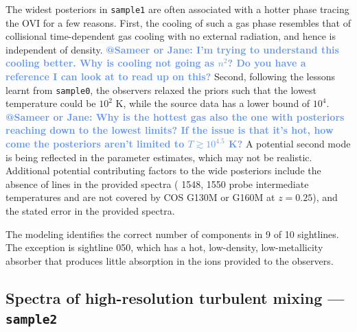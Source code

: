 \documentclass[fleqn,usenatbib]{mnras}
\makeatletter
\newcommand{\atsameer}[1]{\textcolor{CornflowerBlue}{\textbf{@Sameer or Jane: #1}}}
\makeatother
\begin{document}
The widest posteriors in \texttt{sample1} are often associated with a hotter phase tracing the OVI for a few reasons.
First, the cooling of such a gas phase resembles that of collisional time-dependent gas cooling with no external radiation, and hence is independent of density.
\atsameer{I'm trying to understand this cooling better. Why is cooling not going as $n^2$? Do you have a reference I can look at to read up on this?}
Second, following the lessons learnt from \texttt{sample0}, the observers relaxed the priors such that the lowest temperature could be $10^2$ K, while the source data has a lower bound of $10^4$.
\atsameer{Why is the hottest gas also the one with posteriors reaching down to the lowest limits? If the issue is that it's hot, how come the posteriors aren't limited to $T \gtrsim 10^4.5$ K?}
A potential second mode is being reflected in the parameter estimates, which may not be realistic. 
Additional potential contributing factors to the wide posteriors include the absence of  lines in the provided spectra ( 1548, 1550 probe intermediate temperatures and are not covered by COS G130M or G160M at $z=0.25$), 
and the stated error in the provided spectra.

The modeling identifies the correct number of components in 9 of 10 sightlines.
The exception is sightline 050, which has a hot, low-density, low-metallicity absorber that produces little absorption in the ions provided to the observers.

\subsection{Spectra of high-resolution turbulent mixing --- \texttt{sample2}}
\label{s: results -- sample2}
\end{document}
